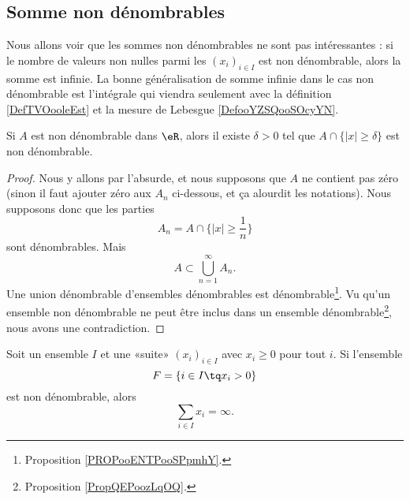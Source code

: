 \subsection{Somme non dénombrables}

Nous allons voir que les sommes non dénombrables ne sont pas intéressantes : si le nombre de valeurs non nulles parmi les \( (x_i)_{i\in I}\) est non dénombrable, alors la somme est infinie. La bonne généralisation de somme infinie dans le cas non dénombrable est l'intégrale qui viendra seulement avec la définition \ref{DefTVOooleEst} et la mesure de Lebesgue \ref{DefooYZSQooSOcyYN}.

\begin{lemma}       \label{LEMooYJCVooHajEbg}
	Si \( A\) est non dénombrable dans \( \eR\), alors il existe \( \delta>0\) tel que \( A\cap \{ | x |\geq \delta \}\) est non dénombrable.
\end{lemma}

\begin{proof}
	Nous y allons par l'absurde, et nous supposons que \( A\) ne contient pas zéro (sinon il faut ajouter zéro aux \( A_n\) ci-dessous, et ça alourdit les notations). Nous supposons donc que les parties
	\begin{equation}
		A_n=A\cap\{ | x |\geq \frac{1}{ n } \}
	\end{equation}
	sont dénombrables. Mais
	\begin{equation}
		A\subset \bigcup_{n=1}^{\infty}A_n.
	\end{equation}
	Une union dénombrable d'ensembles dénombrables est dénombrable\footnote{Proposition \ref{PROPooENTPooSPpmhY}.}. Vu qu'un ensemble non dénombrable ne peut être inclus dans un ensemble dénombrable\footnote{Proposition \ref{PropQEPoozLqOQ}.}, nous avons une contradiction.
\end{proof}

\begin{lemma}       \label{LEMooQIMGooOUpZjk}
	Soit un ensemble \( I\) et une «suite» \( (x_i)_{i\in I}\) avec \( x_i\geq 0\) pour tout \( i\). Si l'ensemble
	\begin{equation}
		F=\{ i\in I\tq x_i>0 \}
	\end{equation}
	est non dénombrable, alors
	\begin{equation}
		\sum_{i\in I}x_i=\infty.
	\end{equation}
\end{lemma}

